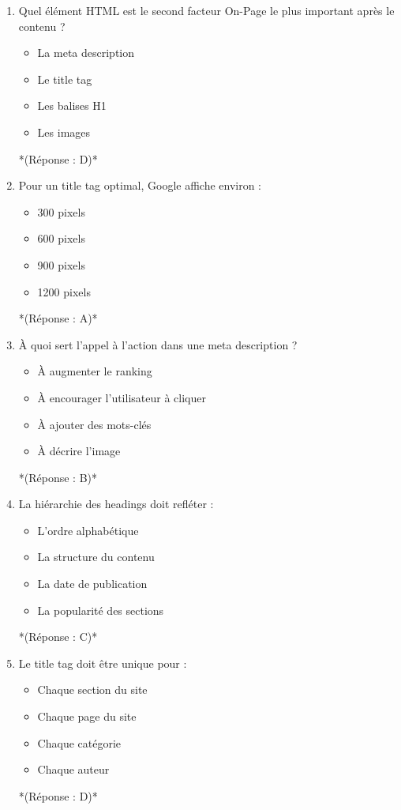 \documentclass[12pt,a4paper,twoside]{report}
\begin{document}
\begin{enumerate}
\item Quel élément HTML est le second facteur On-Page le plus important après le contenu ?
\begin{itemize}
\item[A)] La meta description
\item[B)] Le title tag
\item[C)] Les balises H1
\item[D)] Les images
\end{itemize}
*(Réponse : D)*

\item Pour un title tag optimal, Google affiche environ :
\begin{itemize}
\item[A)] 300 pixels
\item[B)] 600 pixels
\item[C)] 900 pixels
\item[D)] 1200 pixels
\end{itemize}
*(Réponse : A)*

\item À quoi sert l'appel à l'action dans une meta description ?
\begin{itemize}
\item[A)] À augmenter le ranking
\item[B)] À encourager l'utilisateur à cliquer
\item[C)] À ajouter des mots-clés
\item[D)] À décrire l'image
\end{itemize}
*(Réponse : B)*

\item La hiérarchie des headings doit refléter :
\begin{itemize}
\item[A)] L'ordre alphabétique
\item[B)] La structure du contenu
\item[C)] La date de publication
\item[D)] La popularité des sections
\end{itemize}
*(Réponse : C)*

\item Le title tag doit être unique pour :
\begin{itemize}
\item[A)] Chaque section du site
\item[B)] Chaque page du site
\item[C)] Chaque catégorie
\item[D)] Chaque auteur
\end{itemize}
*(Réponse : D)*


\end{enumerate}
\end{document}
